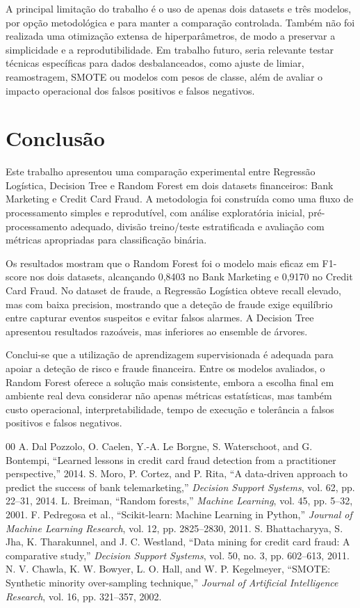 \documentclass[10pt,twocolumn]{article}
\begin{document}
A principal limitação do trabalho é o uso de apenas dois datasets e três modelos, por opção metodológica e para manter a comparação controlada. Também não foi realizada uma otimização extensa de hiperparâmetros, de modo a preservar a simplicidade e a reprodutibilidade. Em trabalho futuro, seria relevante testar técnicas específicas para dados desbalanceados, como ajuste de limiar, reamostragem, SMOTE ou modelos com pesos de classe, além de avaliar o impacto operacional dos falsos positivos e falsos negativos.

\section{Conclusão}
Este trabalho apresentou uma comparação experimental entre Regressão Logística, Decision Tree e Random Forest em dois datasets financeiros: Bank Marketing e Credit Card Fraud. A metodologia foi construída como uma fluxo de processamento simples e reprodutível, com análise exploratória inicial, pré-processamento adequado, divisão treino/teste estratificada e avaliação com métricas apropriadas para classificação binária.

Os resultados mostram que o Random Forest foi o modelo mais eficaz em F1-score nos dois datasets, alcançando 0,8403 no Bank Marketing e 0,9170 no Credit Card Fraud. No dataset de fraude, a Regressão Logística obteve recall elevado, mas com baixa precision, mostrando que a deteção de fraude exige equilíbrio entre capturar eventos suspeitos e evitar falsos alarmes. A Decision Tree apresentou resultados razoáveis, mas inferiores ao ensemble de árvores.

Conclui-se que a utilização de aprendizagem supervisionada é adequada para apoiar a deteção de risco e fraude financeira. Entre os modelos avaliados, o Random Forest oferece a solução mais consistente, embora a escolha final em ambiente real deva considerar não apenas métricas estatísticas, mas também custo operacional, interpretabilidade, tempo de execução e tolerância a falsos positivos e falsos negativos.

\begin{thebibliography}{00}
 A. Dal Pozzolo, O. Caelen, Y.-A. Le Borgne, S. Waterschoot, and G. Bontempi, ``Learned lessons in credit card fraud detection from a practitioner perspective,'' 2014.
 S. Moro, P. Cortez, and P. Rita, ``A data-driven approach to predict the success of bank telemarketing,'' \emph{Decision Support Systems}, vol. 62, pp. 22--31, 2014.
 L. Breiman, ``Random forests,'' \emph{Machine Learning}, vol. 45, pp. 5--32, 2001.
 F. Pedregosa et al., ``Scikit-learn: Machine Learning in Python,'' \emph{Journal of Machine Learning Research}, vol. 12, pp. 2825--2830, 2011.
 S. Bhattacharyya, S. Jha, K. Tharakunnel, and J. C. Westland, ``Data mining for credit card fraud: A comparative study,'' \emph{Decision Support Systems}, vol. 50, no. 3, pp. 602--613, 2011.
 N. V. Chawla, K. W. Bowyer, L. O. Hall, and W. P. Kegelmeyer, ``SMOTE: Synthetic minority over-sampling technique,'' \emph{Journal of Artificial Intelligence Research}, vol. 16, pp. 321--357, 2002.
\end{thebibliography}
\end{document}

